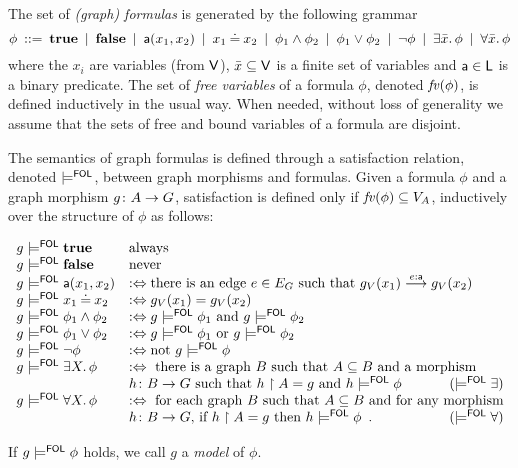 \begin{definition}
  \label{def:graph_formulas}
The set of \emph{(graph) formulas} is generated by the following grammar
%
\[ \phi \:::=\: \textbf{true}
        \:\mid\: \textbf{false}
		\:\mid\: \mathsf{a}(x_1,x_2)
        \:\mid\: x_1 \mathbin{\doteq} x_2
		\:\mid\: \phi_1\wedge \phi_2
		\:\mid\: \phi_1\vee \phi_2
		\:\mid\: \neg\phi
		\:\mid\: \exists \bar x.\, \phi 
		\:\mid\: \forall \bar x.\, \phi 
		\]
where the $x_i$ are variables (from $\mathsf{V}$), 
$\bar x\subseteq \mathsf{V}$ is a finite set of variables and $\mathsf{a} \in \mathsf{L}$ is a binary predicate. The set of \emph{free variables} of a formula $\phi$, denoted $\mathit{fv}(\phi)$, is defined inductively in the usual way. When needed, without loss of generality we assume that the sets of free and bound variables of a formula are disjoint.  

The semantics of graph formulas is defined through a satisfaction relation, denoted $\models^{\mathsf{FOL}}$, between graph morphisms and formulas. Given a formula $\phi$ and a graph morphism $g \colon A \rightarrow G$, satisfaction is defined only if $\mathit{fv}(\phi) \subseteq V_A$, inductively over the structure of $\phi$ as follows: 

\[\begin{array}{ll}
  g\sat^\FOL \True & \text{always} \\
  g\sat^\FOL \False & \text{never} \\
  g\sat^\FOL \la(x_1,x_2) & \iffdef \text{there is an edge } e\in E_G \text{ such that } g_V(x_1) \stackrel{e:\la}{\longrightarrow} g_V(x_2)\\
  g\sat^\FOL x_1\Eq x_2 & \iffdef g_V(x_1)=g_V(x_2) \\
  g\sat^\FOL \phi_1\wedge \phi_2 & \iffdef g\sat^\FOL \phi_1 \text{ and } g\sat^\FOL \phi_2 \\
  g\sat^\FOL \phi_1\vee \phi_2 & \iffdef g\sat^\FOL \phi_1 \text{ or } g\sat^\FOL \phi_2 \\
  g\sat^\FOL \neg\phi & \iffdef \text{not } g\sat^\FOL \phi \\
  g\sat^\FOL \exists X\st \phi  & \iffdef \text{ there is a graph $B$ such that $A \subseteq B$ and a morphism}\\ & \text{$h\of B\to G$ such that $h \restr A = g$ and $h \sat^\FOL \phi$}\hfill (\sat^\FOL \exists)\\
  g\sat^\FOL \forall X\st \phi  & \iffdef \text{ for each graph $B$ such that $A \subseteq B$ and for any morphism}\\ & \text{$h\of B\to G$, if  $h \restr A = g$ then $h \sat^\FOL \phi$}\enspace.\hfill (\sat^\FOL \forall)\\
  \end{array}
  \]

  If $g \models^{\mathsf{FOL}} \phi$ holds, we call $g$ a \emph{model} of $\phi$. 
\end{definition}

